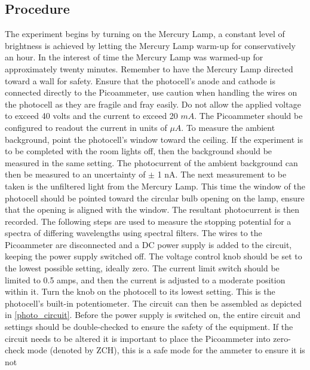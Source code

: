 \documentclass[a4paper]{article}
\begin{document}
\subsection{Procedure}


\qq The experiment begins by turning on the Mercury Lamp, a constant
level of brightness is achieved by letting the Mercury Lamp warm-up
for conservatively an hour. In the interest of time the Mercury Lamp
was warmed-up for approximately twenty minutes. Remember to have the
Mercury Lamp directed toward a wall for safety. Ensure that the
photocell's anode and cathode is connected directly to the
Picoammeter, use caution when handling the wires on the photocell as
they are fragile and fray easily. Do not allow the applied voltage to
exceed 40 volts and the current to exceed 20 $mA$. The
Picoammeter should be configured to readout the current in units of
$\mu A$. To measure the ambient background, point the photocell's
window toward the ceiling. If the experiment is to be completed with
the room lights off, then the background should be measured in the
same setting. The photocurrent of the ambient background can then be
measured to an uncertainty of $\pm$ 1 nA. The next measurement to
be taken is the unfiltered light from the Mercury Lamp. This time the
window of the photocell should be pointed toward the circular bulb
opening on the lamp, ensure that the opening is aligned with the
window. The resultant photocurrent is then recorded. The following
steps are used to measure the stopping potential for a spectra of
differing wavelengths using spectral filters. The wires to the
Picoammeter are disconnected and a DC power supply is added to the
circuit, keeping the power supply switched off. The voltage control
knob should be set to the lowest possible setting, ideally zero. The
current limit switch should be limited to 0.5 amps, and then the
current is adjusted to a moderate position within it. Turn the knob on
the photocell to its lowest setting. This is the photocell's built-in
potentiometer. The circuit can then be assembled as depicted in
\ref{photo_circuit}. Before the power supply is switched on, the
entire circuit and settings should be double-checked to ensure the
safety of the equipment. If the circuit needs to be altered it is
important to place the Picoammeter into zero-check mode (denoted by
ZCH), this is a safe mode for the ammeter to ensure it is not
\end{document}
